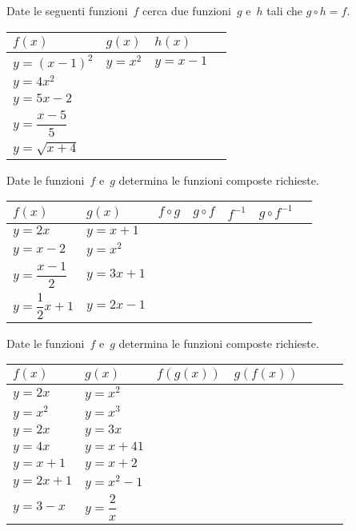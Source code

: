\begin{esercizio}
 \label{ese:8.14}
Date le seguenti funzioni~$f$ cerca due funzioni~$g$ e~$h$ tali che $ g \circ h=f $.
\begin{center}
\begin{tabular}{l*3{l}}
\toprule
$f(x)$ & $ g(x)$ & $ h(x)$ & \\
\midrule
$y=(x-1)^2$ & $y=x^2$ & $y=x-1$\\
$y=4x^2$ &  & \\
$y=5x-2$ &  & \\
$y=\dfrac{x-5}{5}$ &  & \\
$y=\sqrt{x+4}$ &  & \\
\bottomrule
\end{tabular}
\end{center}
\end{esercizio}

\begin{esercizio}
 \label{ese:8.15}
Date le funzioni~$f$ e~$g$ determina le funzioni composte richieste.
\begin{center}
\begin{tabular}{l*6{l}}
\toprule
$f(x)$ & $ g(x)$ & $f \circ g$ & $g \circ f$ & $f^{-1}$ & $g \circ f^{-1}$\\
\midrule
$y=2x$ & $y=x+1$  & & & & \\
$y=x-2$ & $y=x^{2}$ & & & & \\
$y=\dfrac{x-1}{2}$ & $y=3x+1$ & & & & \\
$y=\dfrac{1}{2}x+1$ & $y=2x-1$ & & & & \\
\bottomrule
\end{tabular}
\end{center}
\end{esercizio}

\begin{esercizio}
 \label{ese:8.16}
Date le funzioni~$f$ e~$g$ determina le funzioni composte richieste.
\begin{center}
\begin{tabular}{l*6{l}}
\toprule
$f(x)$ & $ g(x)$ & $f(g(x))$ & $g(f(x))$\\
\midrule
$y=2x$ & $y=x^2$  & & \\
$y=x^2$ & $y=x^{3}$ & & \\
$y=2x$ & $y=3x$ & & \\
$y=4x$ & $y=x+41$ & & \\
$y=x+1$ & $y=x+2$  & & \\
$y=2x+1$ & $y=x^2-1$  & & \\
$y=3-x$ & $y=\dfrac{2}{x}$  & & \\
\bottomrule
\end{tabular}
\end{center}
\end{esercizio}

